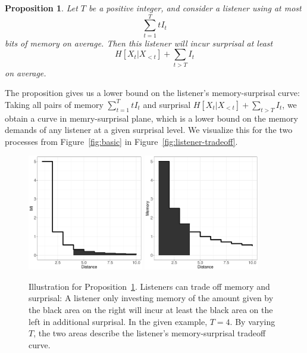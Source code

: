 \documentclass[11pt,letterpaper]{article}
\newcounter{theorem}
\newtheorem{proposition}[theorem]{Proposition}
\begin{document}
\begin{proposition}\label{prop:suboptimal}
	Let $T$ be a positive integer, and consider a listener using at most
$$\sum_{t=1}^T t I_t$$
bits of memory on average.
Then this listener will incur surprisal at least
	$$H[X_t|X_{<t}] + \sum_{t > T} I_t$$
	on average.
\end{proposition}


The proposition gives us a lower bound on the listener's memory-surprisal curve: Taking all pairs of memory $\sum_{t=1}^T t I_t$ and surprisal $H[X_t|X_{<t}] + \sum_{t > T} I_t$, we obtain a curve in memry-surprisal plane, which is a lower bound on the memory demands of any listener at a given surprisal level.
We visualize this for the two processes from Figure~\ref{fig:basic} in Figure~\ref{fig:listener-tradeoff}.

\begin{figure}
\includegraphics[width=0.45\textwidth]{toy/add-surp.pdf}
\includegraphics[width=0.45\textwidth]{toy/lower-mem.pdf}
	\caption{Illustration for Proposition~\ref{prop:suboptimal}. Listeners can trade off memory and surprisal: A listener only investing memory of the amount given by the black area on the right will incur at least the black area on the left in additional surprisal. In the given example, $T=4$. By varying $T$, the two areas describe the listener's memory-surprisal tradeoff curve.}\label{fig:listener-tradeoff-decay}
\end{figure}
\end{document}
